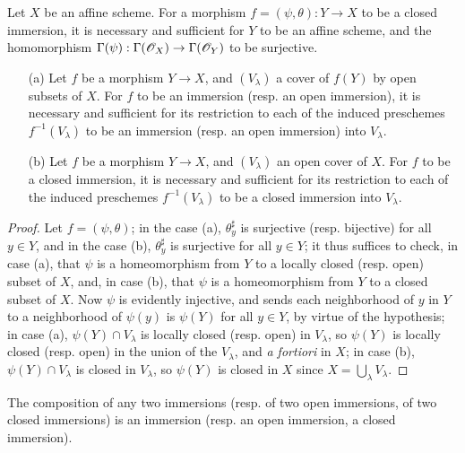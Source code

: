 \begin{corollary}[4.2.3]
\label{I.4.2.3}
Let $X$ be an affine scheme.
For a morphism $f=(\psi,\theta):Y\to X$ to be a closed immersion, it is necessary and sufficient for $Y$ to be an affine scheme, and the homomorphism $\Gamma(\psi):\Gamma(\sh{O}_X)\to\Gamma(\sh{O}_Y)$ to be surjective.
\end{corollary}

\begin{corollary}[4.2.4]
\label{I.4.2.4}
\medskip\noindent
\begin{enumerate}
  \item[{\rm(a)}] Let $f$ be a morphism $Y\to X$, and $(V_\lambda)$ a cover of $f(Y)$ by open subsets of $X$.
    For $f$ to be an immersion (resp. an open immersion), it is necessary and sufficient
    for its restriction to each of the induced preschemes $f^{-1}(V_\lambda)$ to be an immersion (resp. an open immersion) into $V_\lambda$.
  \item[{\rm(b)}] Let $f$ be a morphism $Y\to X$, and $(V_\lambda)$ an open cover of $X$.
    For $f$ to be a closed immersion, it is necessary and sufficient for its restriction to each of the induced preschemes $f^{-1}(V_\lambda)$ to be a closed immersion into $V_\lambda$.
\end{enumerate}
\end{corollary}

\begin{proof}
\label{proof-1.4.2.4}
Let $f=(\psi,\theta)$;
in the case (a), $\theta_y^\sharp$ is surjective (resp. bijective) for all $y\in Y$, and in the case (b), $\theta_y^\sharp$ is surjective for all $y\in Y$;
it thus suffices to check, in case (a), that $\psi$ is a homeomorphism from $Y$ to a locally closed (resp. open) subset of $X$, and, in case (b), that $\psi$ is a homeomorphism from $Y$ to a closed subset of $X$.
Now $\psi$ is evidently injective, and sends each neighborhood of $y$ in $Y$ to a neighborhood of $\psi(y)$ is $\psi(Y)$ for all $y\in Y$, by virtue of the hypothesis;
in case (a), $\psi(Y)\cap V_\lambda$ is locally closed (resp. open) in $V_\lambda$, so $\psi(Y)$ is locally closed (resp. open) in the union of the $V_\lambda$, and \emph{a fortiori} in $X$;
in case (b), $\psi(Y)\cap V_\lambda$ is closed in $V_\lambda$, so $\psi(Y)$ is closed in $X$ since $X=\bigcup_\lambda V_\lambda$.
\end{proof}

\begin{proposition}[4.2.5]
\label{I.4.2.5}
The composition of any two immersions (resp. of two open immersions, of two closed immersions) is an immersion (resp. an open immersion, a closed immersion).
\end{proposition}

